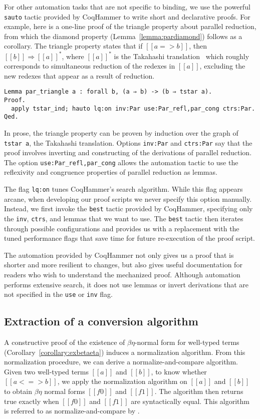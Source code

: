 \documentclass[acmsmall,screen=true,
\ifpublic review=false\else,review=true\fi
  ,anonymous=\ifanonymous true\else false\fi]{acmart}
\begin{document}
For other automation tasks that are not specific to binding, we use
the powerful \texttt{sauto} tactic provided by CoqHammer to write
short and declarative proofs. For example, here is a one-line proof of
the triangle property about parallel reduction, from which the diamond
property (Lemma~\ref{lemma:pardiamond}) follows as a corollary.
The triangle property states
that if $[[a => b]]$, then $[[b]]\Rightarrow [[a]]^*$, where $[[a]]^*$
is the Takahashi translation~\citep{takahashi-parallel-reduction}
which roughly corresponds to simultaneous reduction of the redexes in
$[[a]]$, excluding the new redexes that appear as a result of
reduction.
\begin{verbatim}
Lemma par_triangle a : forall b, (a ⇒ b) -> (b ⇒ tstar a).
Proof.
  apply tstar_ind; hauto lq:on inv:Par use:Par_refl,par_cong ctrs:Par.
Qed.
\end{verbatim}
In prose, the triangle property can be proven by induction over the graph of
\texttt{tstar a}, the Takahashi translation. Options \texttt{inv:Par}
and \texttt{ctrs:Par} say that the proof involves inverting and constructing
of the derivations of parallel reduction. The option
\texttt{use:Par\_refl,par\_cong} allows the automation tactic to use the
reflexivity and congruence properties of parallel reduction as lemmas.

The flag \texttt{lq:on} tunes CoqHammer's search algorithm.  While this flag
appears arcane, when developing our proof scripts we never specify this option
manually. Instead, we first invoke the \texttt{best} tactic provided by
CoqHammer, specifying only the \texttt{inv}, \texttt{ctrs}, and lemmas that we
want to use. The \texttt{best} tactic then iterates through possible
configurations and provides us with a replacement with the tuned performance
flags that save time for future re-execution of the proof script.

The automation provided by CoqHammer not only gives us a proof that is shorter
and more resilient to changes, but also gives useful documentation for readers
who wish to understand the mechanized proof. Although automation performs
extensive search, it does not use lemmas or invert derivations that are not
specified in the \texttt{use} or \texttt{inv} flag.

\subsection{Extraction of a conversion algorithm}
\label{sec:conversionalgo}
A constructive proof of the existence of $\beta\eta$-normal form
for well-typed terms (Corollary~\ref{corollary:exbetaeta}) induces a
normalization algorithm. From this normalization procedure, we can
derive a normalize-and-compare algorithm. Given two well-typed terms
$[[a]]$ and $[[b]]$, to know whether $[[a <=> b]]$, we apply the
normalization algorithm on $[[a]]$ and $[[b]]$ to obtain $\beta\eta$
normal forms $[[f0]]$ and $[[f1]]$. The algorithm then returns true
exactly when $[[f0]]$ and $[[f1]]$ are syntactically equal. This
algorithm is referred to as normalize-and-compare by
\citet{pierce2004advanced}.
\end{document}
